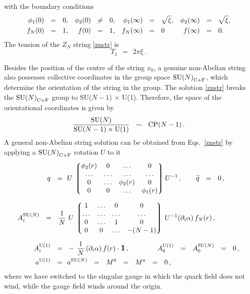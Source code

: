 \documentclass[12pt]{article}
\def\beq{\begin{equation}}
\def\eeq{\end{equation}}
\newcommand{\p}{\partial}
\newcommand{\wt}{\widetilde}
\newcommand{\lgr}{\left\lgroup}
\newcommand{\rgr}{\right\rgroup}
\def\cfl {$\text{SU($N$)}_{\rm C+F}$ }
\def\cfln {$\text{SU($N$)}_{\rm C+F}$}
\newcommand{\aU}{a^{\rm U(1)}}
\newcommand{\aN}{a^\text{SU($N$)}}
\begin{document}
	with the boundary conditions
\begin{align}
%
\label{boundary}
	\phi_1(0) & ~~=~~  0\text,                   & \phi_2(0) & ~~\neq~~ 0\text,  &
	\phi_1(\infty) & ~~=~~ \sqrt{\xi} \text,     & \phi_2(\infty) & ~~=~~ \sqrt{\xi}\text, \\
%
\notag
	f_{N}(0) & ~~=~~ 1\text,                   & f(0) & ~~=~~ 1\text,   &
	f_{N}(\infty) & ~~=~~ 0 \text\,            &  f(\infty) & ~~=~~ 0\text.
\end{align}
	The tension of the $ Z_N $ string \eqref{znstr} is 
\[
	T_1  ~~=~~ 2\pi\xi~.
\]
	
	Besides the position of the centre of the string $ x_0 $, a genuine non-Abelian string 
	also possesses collective coordinates in the group space \cfln, which determine the orientation 
	of the string in the group.	
	The solution \eqref{znstr} breaks the \cfl group to SU($N-1$) $\times$ U(1).
	Therefore, the space of the orientational coordinates is given by 
\beq
\label{modulispace}
	\frac{\text{SU($N$)}}
            {\text{SU($N-1$)} \times {\rm U(1)}}         ~~\sim~~  \text{CP($N-1$)}\,.
\eeq
	A general non-Abelian string solution can be obtained from Eqs.~\eqref{znstr} by applying
	a \cfl rotation $ U $ to it
\begin{align}
%
\notag
	q ~~=~~ & U\, \lgr \begin{matrix}
			   	\phi_2(r)  & 0  & \ldots & 0 \\
				\ldots  &  \ldots & \ldots & \ldots \\
				0  & \ldots      & \phi_2(r) &  0 \\
				0  & 0           & \ldots  &  \phi_1(r) 
			   \end{matrix}        \rgr     
			U^{-1} \,,
		\qquad \wt{q} ~~=~~ 0\,,
		\\[2mm]
%
\label{nastr}
%
	A_i^\text{SU($N$)} ~~=~~ \frac{1}{N}\, &\, U\, \lgr \begin{matrix}
					          	1  & \ldots & 0 & 0 \\
						  	\ldots & \ldots & \ldots & \ldots \\
							0  & \ldots  & 1  &  0 \\
							0  & 0   & \ldots  &  - (N-1) 
					         \end{matrix} \rgr  \, U^{-1} (\p_i \alpha)\, f_{N}(r)\,,  \\[2mm]
%
\notag
	A_i^{\rm U(1)} ~~=~~ & -\,\frac{1}{N}\, (\p_i \alpha)\, f(r) \cdot \mathlarger{\mathbf{1}}\,,
	\qquad\qquad
			A_0^{\rm U(1)} ~~=~~ A_0^\text{SU($N$)} ~~=~~ 0\,,
	\\
%
\notag
	\aU ~~=~~ & \aN ~~=~~ M^0 ~~=~~ M^a ~~=~~ 0\,,
\end{align}
	where we have switched to the singular gauge in which the quark field does not wind, while the
	gauge field winds around the origin.
\end{document}
